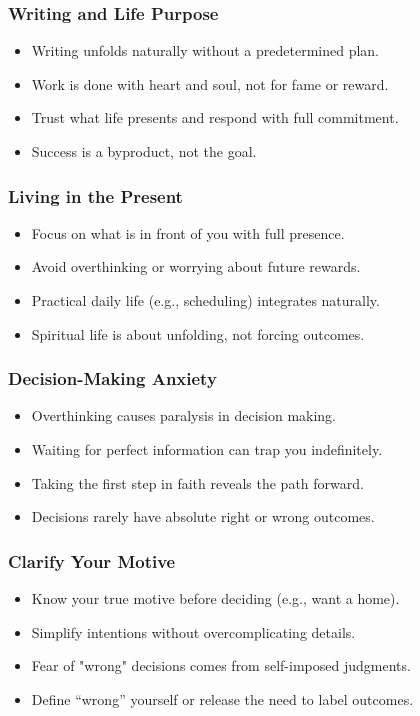 \begin{frame}[fragile]\frametitle{Writing and Life Purpose}
  \begin{itemize}
    \item Writing unfolds naturally without a predetermined plan.
    \item Work is done with heart and soul, not for fame or reward.
    \item Trust what life presents and respond with full commitment.
    \item Success is a byproduct, not the goal.
  \end{itemize}
\end{frame}

\begin{frame}[fragile]\frametitle{Living in the Present}
  \begin{itemize}
    \item Focus on what is in front of you with full presence.
    \item Avoid overthinking or worrying about future rewards.
    \item Practical daily life (e.g., scheduling) integrates naturally.
    \item Spiritual life is about unfolding, not forcing outcomes.
  \end{itemize}
\end{frame}

\begin{frame}[fragile]\frametitle{Decision-Making Anxiety}
  \begin{itemize}
    \item Overthinking causes paralysis in decision making.
    \item Waiting for perfect information can trap you indefinitely.
    \item Taking the first step in faith reveals the path forward.
    \item Decisions rarely have absolute right or wrong outcomes.
  \end{itemize}
\end{frame}

\begin{frame}[fragile]\frametitle{Clarify Your Motive}
  \begin{itemize}
    \item Know your true motive before deciding (e.g., want a home).
    \item Simplify intentions without overcomplicating details.
    \item Fear of "wrong" decisions comes from self-imposed judgments.
    \item Define “wrong” yourself or release the need to label outcomes.
  \end{itemize}
\end{frame}

